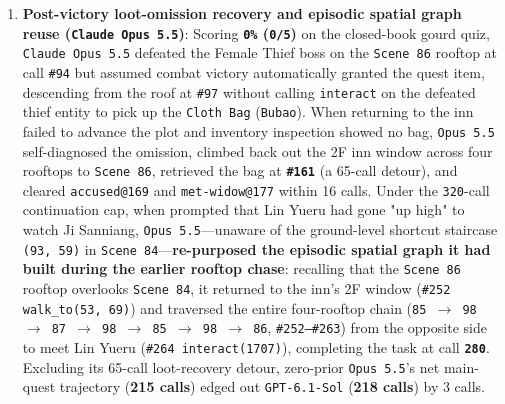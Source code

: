 \documentclass[11pt,a4paper]{article}
\begin{document}
\begin{enumerate}
\item \textbf{Post-victory loot-omission recovery and episodic spatial graph reuse (\texttt{Claude\allowbreak{} \allowbreak{}Opus\allowbreak{} \allowbreak{}5\allowbreak{}.\allowbreak{}5})}: Scoring \textbf{\texttt{0\%} (\texttt{0\allowbreak{}/\allowbreak{}5})} on the closed-book gourd quiz, \texttt{Claude\allowbreak{} \allowbreak{}Opus\allowbreak{} \allowbreak{}5\allowbreak{}.\allowbreak{}5} defeated the Female Thief boss on the \texttt{Scene\allowbreak{} \allowbreak{}86} rooftop at call \texttt{\#94} but assumed combat victory automatically granted the quest item, descending from the roof at \texttt{\#97} without calling \texttt{interact} on the defeated thief entity to pick up the \texttt{Cloth\allowbreak{} \allowbreak{}Bag} (\texttt{Bubao}). When returning to the inn failed to advance the plot and inventory inspection showed no bag, \texttt{Opus\allowbreak{} \allowbreak{}5\allowbreak{}.\allowbreak{}5} self-diagnosed the omission, climbed back out the 2F inn window across four rooftops to \texttt{Scene\allowbreak{} \allowbreak{}86}, retrieved the bag at \textbf{\texttt{\#161}} (a 65-call detour), and cleared \texttt{accused@\allowbreak{}169} and \texttt{met\allowbreak{}-\allowbreak{}widow@177} within 16 calls. Under the \texttt{320}-call continuation cap, when prompted that Lin Yueru had gone "up high" to watch Ji Sanniang, \texttt{Opus\allowbreak{} \allowbreak{}5\allowbreak{}.\allowbreak{}5}---unaware of the ground-level shortcut staircase \texttt{(93\allowbreak{},\allowbreak{} \allowbreak{}59)} in \texttt{Scene\allowbreak{} \allowbreak{}84}---\textbf{re-purposed the episodic spatial graph it had built during the earlier rooftop chase}: recalling that the \texttt{Scene\allowbreak{} \allowbreak{}86} rooftop overlooks \texttt{Scene\allowbreak{} \allowbreak{}84}, it returned to the inn's 2F window (\texttt{\#252\allowbreak{} \allowbreak{}walk\allowbreak{}\_\allowbreak{}to(53\allowbreak{},\allowbreak{} \allowbreak{}69)}) and traversed the entire four-rooftop chain (\texttt{85\allowbreak{} \allowbreak{}\ensuremath{\rightarrow}\allowbreak{} \allowbreak{}98\allowbreak{} \allowbreak{}\ensuremath{\rightarrow}\allowbreak{} \allowbreak{}87\allowbreak{} \allowbreak{}\ensuremath{\rightarrow}\allowbreak{} \allowbreak{}98\allowbreak{} \allowbreak{}\ensuremath{\rightarrow}\allowbreak{} \allowbreak{}85\allowbreak{} \allowbreak{}\ensuremath{\rightarrow}\allowbreak{} \allowbreak{}98\allowbreak{} \allowbreak{}\ensuremath{\rightarrow}\allowbreak{} \allowbreak{}86}, \texttt{\#252--\#263}) from the opposite side to meet Lin Yueru (\texttt{\#264\allowbreak{} \allowbreak{}interact\allowbreak{}(1707)}), completing the task at call \textbf{\texttt{280}}. Excluding its 65-call loot-recovery detour, zero-prior \texttt{Opus\allowbreak{} \allowbreak{}5\allowbreak{}.\allowbreak{}5}'s net main-quest trajectory (\textbf{215 calls}) edged out \texttt{GPT\allowbreak{}-\allowbreak{}6\allowbreak{}.\allowbreak{}1\allowbreak{}-\allowbreak{}Sol} (\textbf{218 calls}) by 3 calls.

\end{enumerate}
\end{document}
